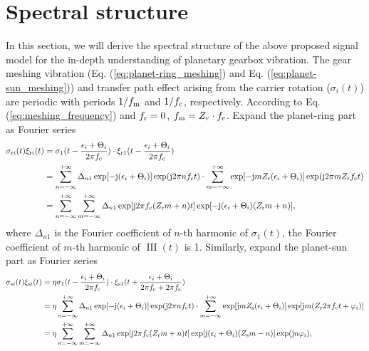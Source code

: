 \documentclass[a4paper,fleqn]{cas-sc}%
\begin{document}
\section{Spectral structure}
\par In this section, we will derive the spectral structure of the above proposed signal model for the in-depth understanding of planetary gearbox vibration. The gear meshing vibration (Eq. (\ref{eq:planet-ring_meshing}) and Eq. (\ref{eq:planet-sun_meshing})) and transfer path effect arising from the carrier rotation ($\sigma_{i}(t)$) are periodic with periods $1/f_{\rm m}$ and $1/f_{\rm c}$, respectively. According to Eq. (\ref{eq:meshing_frequency}) and $f_{\rm r}=0$, $f_{\rm m}=Z_{r} \cdot f_{\rm c}$. Expand the planet-ring part as Fourier series
\begin{equation}
    \begin{split}
    \sigma_{{\rm r}i}(t) \xi_{{\rm r}i}(t)&=\sigma_{1}(t-\frac{\epsilon_i+\Theta_i}{2 \pi f_{\rm c}}) \cdot \xi_{{\rm r}1}(t-\frac{\epsilon_i+\Theta_i}{2 \pi f_{\rm c}}) \\
    &=\sum_{n=-\infty}^{+\infty} \Delta_{n 1} \exp[-{\rm j} (\epsilon_i+\Theta_i)] \exp({\rm j} 2 \pi n f_{\rm c} t)%
    \cdot \sum_{m=-\infty}^{+\infty} \exp[-{\rm j} m Z_{\rm r} (\epsilon_i + \Theta_i)] \exp({\rm j} 2 \pi m Z_{\rm r} f_{\rm c} t)\\%
    &=\sum_{n=-\infty}^{+\infty} \sum_{m=-\infty}^{+\infty} \Delta_{n 1} \exp[{\rm j} 2 \pi f_{\rm c} (Z_{\rm r} m +n) t] \exp[-{\rm j} (\epsilon_i+\Theta_i) (Z_{\rm r} m +n)],
    \end{split}
\end{equation}
where $\Delta_{n 1}$ is the Fourier coefficient of $n$-th harmonic of $\sigma_1(t)$, the Fourier coefficient of $m$-th harmonic of $\operatorname{III}(t)$ is 1. Similarly, expand the planet-sun part as Fourier series
\begin{equation}
    \begin{split}
    \sigma_{{\rm s}i}(t) \xi_{{\rm s}i}(t)&=\eta \sigma_{1}(t-\frac{\epsilon_i+\Theta_i}{2 \pi f_{\rm c}}) \cdot \xi_{{\rm s}1}(t + \frac{\epsilon_i+\Theta_i}{2 \pi f_{\rm c}+ 2 \pi f_{\rm s}}) \\
    &=\eta \sum_{n=-\infty}^{+\infty} \Delta_{n 1} \exp[-{\rm j} (\epsilon_i+\Theta_i)] \exp({\rm j} 2 \pi n f_{\rm c} t)%
    \cdot \sum_{m=-\infty}^{+\infty} \exp[{\rm j} m Z_{\rm s} (\epsilon_i + \Theta_i)] \exp[{\rm j} m ( Z_{\rm r} 2 \pi f_{\rm c} t + \varphi_i)]\\%
    &=\eta \sum_{n=-\infty}^{+\infty} \sum_{m=-\infty}^{+\infty} \Delta_{n 1} \exp[{\rm j} 2 \pi f_{\rm c} (Z_{\rm r} m +n) t] \exp[{\rm j} (\epsilon_i+\Theta_i) (Z_{\rm s} m -n)] \exp({\rm j} n \varphi_i),
    \end{split}
\end{equation}
\end{document}
